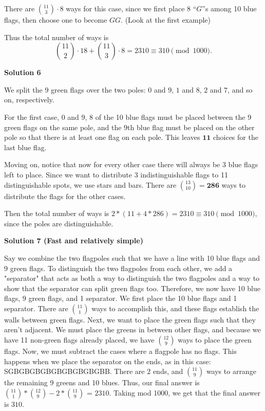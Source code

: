 \begin{enumerate}
 There are $\binom{11}{3}\cdot 8$ ways for this case, since we first place 8 “$G$”s among 10 blue flags, then choose one to become $GG$. (Look at the first example)

 Thus the total number of ways is
 \[\binom{11}{2}\cdot 18 + \binom{11}{3}\cdot 8 = 2310 \equiv \boxed{310} \pmod{1000}.\]




\textbf{Solution 6}

We split the 9 green flags over the two poles: $0$ and $9$, $1$ and $8$, $2$ and $7$, and so on, respectively.

 For the first case, $0$ and $9$, 8 of the 10 blue flags must be placed between the 9 green flags on the same pole, and the 9th blue flag must be placed on the other pole so that there is at least one flag on each pole. This leaves $\textbf{11}$ choices for the last blue flag.

 Moving on, notice that now for every other case there will always be 3 blue flags left to place. Since we want to distribute 3 indistinguishable flags to 11 distinguishable spots, we use stars and bars. There are $\binom{13}{10} = \textbf{286}$ ways to distribute the flags for the other cases.

 Then the total number of ways is $2 * (11 + 4 * 286) = 2310 \equiv \boxed{310} \pmod{1000}$, since the poles are distinguishable.

 



\textbf{Solution 7 (Fast and relatively simple)}

Say we combine the two flagpoles such that we have a line with 10 blue flags and 9 green flags. To distinguish the two flagpoles from each other, we add a "separator" that acts as both a way to distinguish the two flagpoles and a way to show that the separator can split green flags too. Therefore, we now have 10 blue flags, 9 green flags, and 1 separator. We first place the 10 blue flags and 1 separator. There are $\binom{11}{1}$ ways to accomplish this, and these flags establish the walls between green flags. Next, we want to place the green flags such that they aren't adjacent. We must place the greens in between other flags, and because we have 11 non-green flags already placed, we have $\binom{12}{9}$ ways to place the green flags. Now, we must subtract the cases where a flagpole has no flags. This happens when we place the separator on the ends, as in this case: SGBGBGBGBGBGBGBGBGBB. There are $2$ ends, and $\binom{11}{9}$ ways to arrange the remaining 9 greens and 10 blues. Thus, our final answer is $\binom{11}{1} * \binom{12}{9} - 2 * \binom{11}{9}$ = $2310$. Taking mod 1000, we get that the final answer is $\boxed{310}$.


\end{enumerate}
